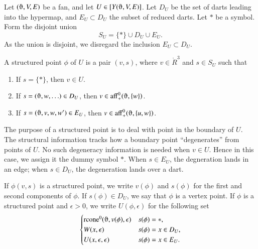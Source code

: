     \label{sec:proof-2}

Let $(\orgn,V,E)$ be a fan, and let $U\in [Y(\orgn,V,E)]$.  Let $D_U$ be the set of darts leading into the hypermap, and $E_{U}\subset D_U$ the subset of reduced darts.
Let $*$ be a symbol. Form the disjoint union
 $$
 S_U =  \{*\} \cup D_U \cup E_U.
$$
As the union is disjoint, we disregard the inclusion $E_U\subset D_U$.

\begin{definition} A structured point $\phi$ of $U$ is a pair $(v,s)$,
where $v\in\ring{R}^3$ and $s\in S_U$ such that
\begin{enumerate}
\item If $s = \{*\}$, then $v \in U$.\\
\item If $s = (\orgn,w,\ldots)\in D_U$, then $v\in\op{aff}_+^0(\orgn,\{w\})$.
\item If $s=(\orgn,v,w,w')\in E_U$, then $v\in\op{aff}_+^0(\orgn,\{u,w\})$.
\end{enumerate}
\end{definition}

\begin{remark} The purpose of a structured point is to deal with point in the boundary of $U$.  The structural information  tracks how a boundary point ``degenerates'' from points of $U$.  No such degeneracy information is needed when $v\in U$.  Hence in this case, we assign it the dummy symbol $*$.  When $s\in E_U$, the degneration lands in an edge; when $s\in D_U$, the degeneration lands over a dart.
\end{remark}

If $\phi(v,s)$ is a structured point, we write $v(\phi)$ and $s(\phi)$ for the first and second components of $\phi$.  If $s(\phi)\in D_U$, we say that $\phi$ is a vertex point.  If $\phi$ is a structured point and $\epsilon > 0$, we write $U(\phi,\epsilon)$ for the following set
$$
\begin{cases}
  \op{rcone}^0(\orgn,v(\phi),\epsilon)&s(\phi) = *,   \\
  W(x,\epsilon)& s(\phi) = x\in D_U,   \\
  U(x,\epsilon,\epsilon) &s(\phi) = x\in E_U.   \\
\end{cases}
$$

